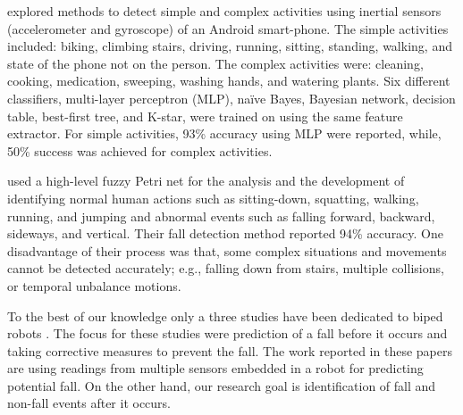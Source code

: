 \documentclass{IEEEtran}
\begin{document}
\cite{DernbachActivityAndFallDetectionPhone2012} explored methods to detect simple and complex activities using inertial 
sensors (accelerometer and gyroscope) of an Android smart-phone. The simple activities included: 
biking, climbing stairs, driving, running, sitting, standing, walking, and state of the phone not 
on the person. The complex activities were: cleaning, cooking, medication, sweeping, washing hands, 
and watering plants. Six different classifiers, multi-layer  perceptron (MLP), na\"{i}ve  Bayes,  
Bayesian  network,  decision  table,  best-first tree, and  K-star,  were trained on using the same 
feature extractor. For simple activities, 93\% accuracy using MLP were reported, while, 50\% 
success was achieved for complex activities.    

\cite{ShenFallDetectionPhone2015} used a  high-level fuzzy Petri net for the analysis and the development of 
identifying normal human actions such as sitting-down, squatting, walking, running, and jumping and 
abnormal events such as falling forward, backward, sideways, and vertical. Their fall detection 
method reported 94\% accuracy. One disadvantage of their process was that, some complex situations 
and movements cannot be detected accurately; e.g., falling down from  stairs, multiple collisions, 
or temporal unbalance motions.

\par 
To the 
best of our knowledge only a three studies have been dedicated to biped robots \cite{Andre2015,Goswami2014,Moya2015}. The focus for these studies were prediction of a fall before it occurs and taking corrective measures to prevent the fall. The work reported in these papers are using readings from multiple sensors embedded in a robot for predicting potential fall. On the other hand, our research goal is identification of fall and non-fall events after it occurs.


\end{document}
